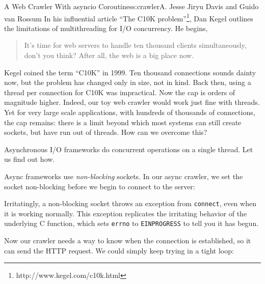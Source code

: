 \begin{aosachapter}{A Web Crawler With asyncio Coroutines}{s:crawler}{A. Jesse Jiryu Davis and Guido van Rossum}
In his influential article ``The C10K problem''\footnote{http://www.kegel.com/c10k.html},
Dan Kegel outlines the limitations of multithreading for I/O
concurrency. He begins,

\begin{quote}
It's time for web servers to handle ten thousand clients simultaneously,
don't you think? After all, the web is a big place now.
\end{quote}

Kegel coined the term ``C10K'' in 1999. Ten thousand connections sounds
dainty now, but the problem has changed only in size, not in kind. Back
then, using a thread per connection for C10K was impractical. Now the
cap is orders of magnitude higher. Indeed, our toy web crawler would
work just fine with threads. Yet for very large scale applications, with
hundreds of thousands of connections, the cap remains: there is a limit
beyond which most systems can still create sockets, but have run out of
threads. How can we overcome this?

\label{async}

Asynchronous I/O frameworks do concurrent operations on a single thread.
Let us find out how.

Async frameworks use \emph{non-blocking} sockets. In our async crawler,
we set the socket non-blocking before we begin to connect to the server:

\begin{Shaded}
\begin{Highlighting}[]
\NormalTok{)}
\NormalTok{:}
    \NormalTok{((}\NormalTok{, }\NormalTok{))}
 \NormalTok{:}
\end{Highlighting}
\end{Shaded}

Irritatingly, a non-blocking socket throws an exception from
\texttt{connect}, even when it is working normally. This exception
replicates the irritating behavior of the underlying C function, which
sets \texttt{errno} to \texttt{EINPROGRESS} to tell you it has begun.

Now our crawler needs a way to know when the connection is established,
so it can send the HTTP request. We could simply keep trying in a tight
loop:

\begin{Shaded}
\begin{Highlighting}[]
\NormalTok{)}


\end{Highlighting}
\end{Shaded}
\end{aosachapter}

